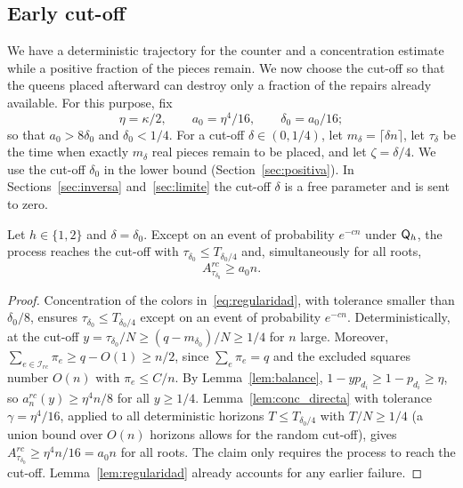 \subsection{Early cut-off}

We have a deterministic trajectory for the counter and a concentration estimate while a positive fraction of
the pieces remain. We now
choose the cut-off so that the queens placed afterward can destroy only a fraction of the repairs already
available. For this purpose,
fix \begin{equation}\label{eq:constantes}
 \eta=\kappa/2,\qquad a_0=\eta^4/16,\qquad \delta_0=a_0/16;
\end{equation} so that $a_0>8\delta_0$ and $\delta_0<1/4$. For a cut-off $\delta\in(0,1/4)$, let
$m_\delta=\lceil\delta n\rceil$, let
$\tau_\delta$ be the time when exactly $m_\delta$ real pieces remain to be placed, and let $\zeta=\delta/4$.
We use the cut-off
$\delta_0$ in the lower bound (Section~\ref{sec:positiva}). In Sections~\ref{sec:inversa}
and~\ref{sec:limite} the cut-off $\delta$ is
a free parameter and is sent to zero.

\begin{lema}\label{lem:corte} Let $h\in\{1,2\}$ and $\delta=\delta_0$. Except on
an event of probability
$e^{-cn}$ under $\mathsf{Q}_h$, the process reaches the cut-off with $\tau_{\delta_0}\le T_{\delta_0/4}$ and,
simultaneously for all roots,
\begin{equation}\label{eq:corte}
 A^{rc}_{\tau_{\delta_0}}\ge a_0n .
\end{equation} \end{lema}

\begin{proof} Concentration of the colors in~\eqref{eq:regularidad}, with tolerance smaller than
$\delta_0/8$, ensures
$\tau_{\delta_0}\le T_{\delta_0/4}$ except on an event of probability $e^{-cn}$. Deterministically, at the
cut-off
$y=\tau_{\delta_0}/N\ge(q-m_{\delta_0})/N\ge1/4$ for $n$ large. Moreover,
$\sum_{e\in\mathcal I_{rc}}\pi_e\ge q-O(1)\ge n/2$, since
$\sum_e\pi_e=q$ and the excluded squares number $O(n)$ with $\pi_e\le C/n$. By Lemma~\ref{lem:balance},
$1-yp_{d_i}\ge1-p_{d_i}\ge\eta$, so $a_n^{rc}(y)\ge\eta^4n/8$ for all $y\ge1/4$.
Lemma~\ref{lem:conc_directa} with tolerance
$\gamma=\eta^4/16$, applied to all deterministic horizons $T\le T_{\delta_0/4}$ with $T/N\ge1/4$ (a union
bound over $O(n)$ horizons
allows for the random cut-off), gives $A^{rc}_{\tau_{\delta_0}}\ge\eta^4n/16=a_0n$ for all roots. The claim
only requires the process
to reach the cut-off. Lemma~\ref{lem:regularidad} already accounts for any earlier failure. \end{proof}

